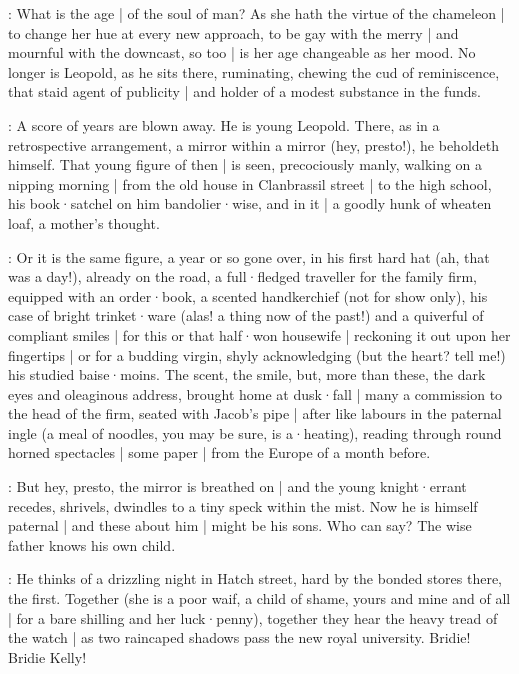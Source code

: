 

:
What is the age |
of the soul of man?
As she hath the virtue of the chameleon |
to change her hue at every new approach,
to be gay with the merry |
and mournful with the downcast,
so too |
is her age changeable as her mood.
No longer is Leopold,
as he sits there,
ruminating,
chewing the cud of reminiscence,
that staid agent of publicity |
and holder of a modest substance in the funds.

:
A score of years are blown away.
He is young Leopold.
There,
as in a retrospective arrangement,
a mirror within a mirror
(hey, presto!),
he beholdeth himself.
That young figure of then |
is seen,
precociously manly,
walking on a nipping morning |
from the old house in Clanbrassil street |
to the high school,
his book·satchel on him bandolier·wise,
and in it |
a goodly hunk of wheaten loaf,
a mother's thought.

:
Or it is the same figure,
a year or so gone over,
in his first hard hat
(ah, that was a day!),
already on the road,
a full·fledged traveller for the family firm,
equipped with an order·book,
a scented handkerchief
(not for show only),
his case of bright trinket·ware
(alas!
a thing now of the past!)
and a quiverful of compliant smiles |
for this or that half·won housewife |
reckoning it out upon her fingertips |
or for a budding virgin,
shyly acknowledging
(but the heart?
tell me!)
his studied baise·moins.
The scent,
the smile,
but,
more than these,
the dark eyes and oleaginous address,
brought home at dusk·fall |
many a commission to the head of the firm,
seated with Jacob's pipe |
after like labours in the paternal ingle
(a meal of noodles,
you may be sure,
is a·heating),
reading through round horned spectacles |
some paper |
from the Europe of a month before.

:
But hey,
presto,
the mirror is breathed on |
and the young knight·errant recedes,
shrivels,
dwindles to a tiny speck within the mist.
Now he is himself paternal |
and these about him |
might be his sons.
Who can say?
The wise father knows his own child.

:
He thinks of a drizzling night in Hatch street,
hard by the bonded stores there,
the first.
Together
(she is a poor waif,
a child of shame,
yours and mine and of all |
for a bare shilling and her luck·penny),
together they hear the heavy tread of the watch |
as two raincaped shadows pass the new royal university.
Bridie!
Bridie Kelly!

